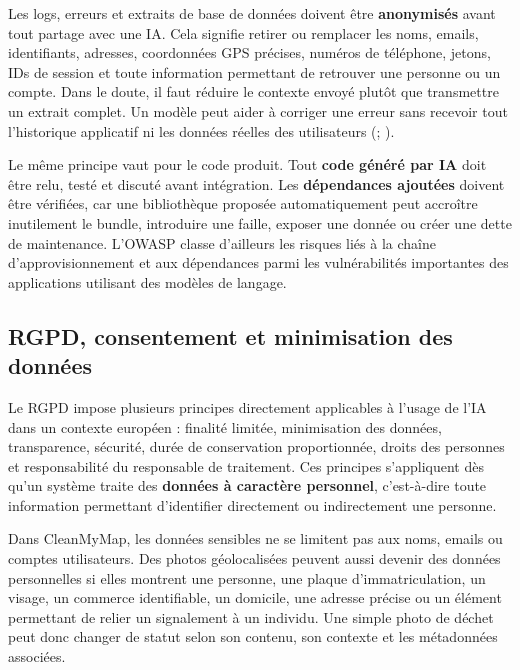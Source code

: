 \documentclass[
  10pt,
  a4paper,
  DIV=11,
  numbers=noendperiod,
  oneside]{scrreprt}
\let\oldtextbf\textbf
\renewcommand{\textbf}[1]{\oldtextbf{\textcolor{cmmnavy}{#1}}}
\begin{document}
Les logs, erreurs et extraits de base de données doivent être
\textbf{anonymisés} avant tout partage avec une IA. Cela signifie
retirer ou remplacer les noms, emails, identifiants, adresses,
coordonnées GPS précises, numéros de téléphone, jetons, IDs de session
et toute information permettant de retrouver une personne ou un compte.
Dans le doute, il faut réduire le contexte envoyé plutôt que transmettre
un extrait complet. Un modèle peut aider à corriger une erreur sans
recevoir tout l'historique applicatif ni les données réelles des
utilisateurs (; ).

Le même principe vaut pour le code produit. Tout \textbf{code généré par
IA} doit être relu, testé et discuté avant intégration. Les
\textbf{dépendances ajoutées} doivent être vérifiées, car une
bibliothèque proposée automatiquement peut accroître inutilement le
bundle, introduire une faille, exposer une donnée ou créer une dette de
maintenance. L'OWASP classe d'ailleurs les risques liés à la chaîne
d'approvisionnement et aux dépendances parmi les vulnérabilités
importantes des applications utilisant des modèles de langage.

\subsection{RGPD, consentement et minimisation des
données}\label{rgpd-consentement-et-minimisation-des-donnuxe9es}

Le RGPD impose plusieurs principes directement applicables à l'usage de
l'IA dans un contexte européen : finalité limitée, minimisation des
données, transparence, sécurité, durée de conservation proportionnée,
droits des personnes et responsabilité du responsable de traitement. Ces
principes s'appliquent dès qu'un système traite des \textbf{données à
caractère personnel}, c'est-à-dire toute information permettant
d'identifier directement ou indirectement une personne.

Dans CleanMyMap, les données sensibles ne se limitent pas aux noms,
emails ou comptes utilisateurs. Des photos géolocalisées peuvent aussi
devenir des données personnelles si elles montrent une personne, une
plaque d'immatriculation, un visage, un commerce identifiable, un
domicile, une adresse précise ou un élément permettant de relier un
signalement à un individu. Une simple photo de déchet peut donc changer
de statut selon son contenu, son contexte et les métadonnées associées.
\end{document}
